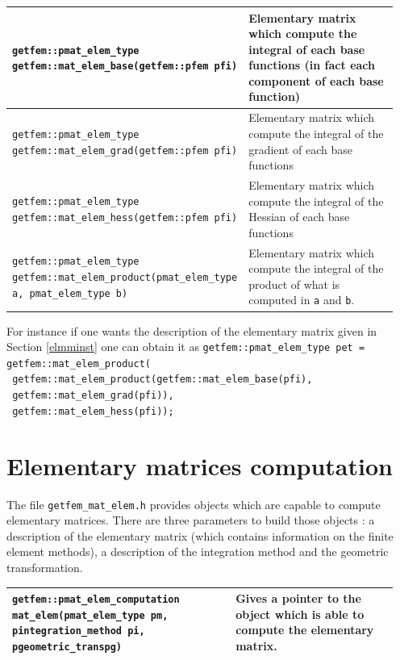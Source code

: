 \documentclass[11pt,a4paper]{article}
\begin{document}
\begin{center} \begin{tabular}{|m{0.55\linewidth}|m{0.4\linewidth}|} \hline
{\tt getfem::pmat\_elem\_type getfem::mat\_elem\_base(getfem::pfem pfi) } & Elementary matrix which compute the integral of each base functions (in fact each component of each base function)\\ \hline
{\tt getfem::pmat\_elem\_type getfem::mat\_elem\_grad(getfem::pfem pfi) } & Elementary matrix which compute the integral of the gradient of each base functions\\ \hline
{\tt getfem::pmat\_elem\_type getfem::mat\_elem\_hess(getfem::pfem pfi) } & Elementary matrix which compute the integral of the Hessian of each base functions\\ \hline
{\tt getfem::pmat\_elem\_type getfem::mat\_elem\_product(pmat\_elem\_type a, pmat\_elem\_type b) } & Elementary matrix which compute the integral of the product of what is computed in {\tt a} and {\tt b}. \\ \hline
\end{tabular} \end{center}

For instance if one wants the description of the elementary matrix given in Section \ref{elmminst} one can obtain it as
{\tt getfem::pmat\_elem\_type pet = getfem::mat\_elem\_product(\\
    $\mbox{}$\hspace{10em} getfem::mat\_elem\_product(getfem::mat\_elem\_base(pfi), \\
     $\mbox{}$\hspace{22.5em}      getfem::mat\_elem\_grad(pfi)),\\
     $\mbox{}$\hspace{22.5em}      getfem::mat\_elem\_hess(pfi));
}


\section{Elementary matrices computation}

The file {\tt getfem\_mat\_elem.h} provides objects which are capable to compute elementary matrices.  There are three parameters to build those objects : a description of the elementary matrix (which contains information on the finite element methods), a description of the integration method and the geometric transformation.

\begin{center} \begin{tabular}{|m{0.55\linewidth}|m{0.4\linewidth}|} \hline
{\tt getfem::pmat\_elem\_computation mat\_elem(pmat\_elem\_type pm, pintegration\_method pi, pgeometric\_trans\;pg)} & Gives a pointer to the object which is able to compute the elementary matrix. \\ \hline
\end{tabular} \end{center}
\end{document}
